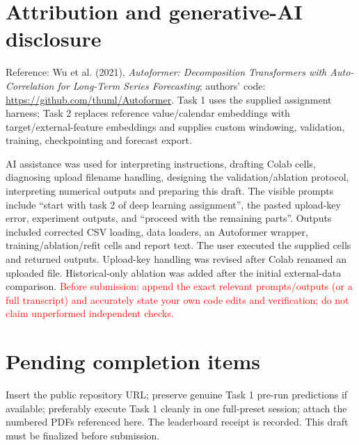 \documentclass[10pt,a4paper]{article}
\begin{document}
\newpage
\section*{Attribution and generative-AI disclosure}
Reference: Wu et al. (2021), \emph{Autoformer: Decomposition Transformers with Auto-Correlation for Long-Term Series Forecasting}; authors' code: \url{https://github.com/thuml/Autoformer}. Task 1 uses the supplied assignment harness; Task 2 replaces reference value/calendar embeddings with target/external-feature embeddings and supplies custom windowing, validation, training, checkpointing and forecast export.

AI assistance was used for interpreting instructions, drafting Colab cells, diagnosing upload filename handling, designing the validation/ablation protocol, interpreting numerical outputs and preparing this draft. The visible prompts include ``start with task 2 of deep learning assignment'', the pasted upload-key error, experiment outputs, and ``proceed with the remaining parts''. Outputs included corrected CSV loading, data loaders, an Autoformer wrapper, training/ablation/refit cells and report text. The user executed the supplied cells and returned outputs. Upload-key handling was revised after Colab renamed an uploaded file. Historical-only ablation was added after the initial external-data comparison. \textcolor{red}{Before submission: append the exact relevant prompts/outputs (or a full transcript) and accurately state your own code edits and verification; do not claim unperformed independent checks.}

\section*{Pending completion items}
Insert the public repository URL;  preserve genuine Task 1 pre-run predictions if available; preferably execute Task 1 cleanly in one full-preset session; attach the numbered PDFs referenced here. The leaderboard receipt is recorded. This draft must be finalized before submission.
\end{document}
